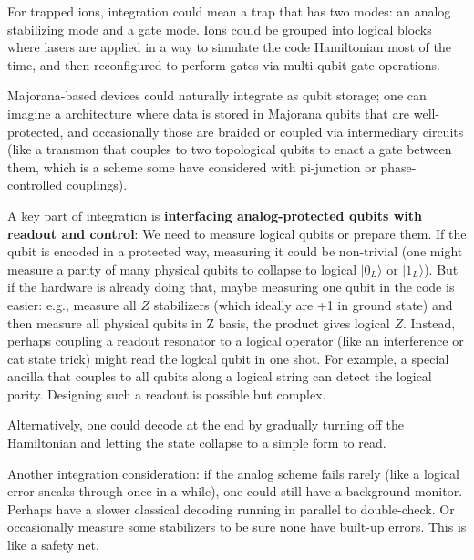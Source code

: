 \documentclass[11pt]{article}
\begin{document}
For trapped ions, integration could mean a trap that has two modes: an analog stabilizing mode and a gate mode. Ions could be grouped into logical blocks where lasers are applied in a way to simulate the code Hamiltonian most of the time, and then reconfigured to perform gates via multi-qubit gate operations.

Majorana-based devices could naturally integrate as qubit storage; one can imagine a architecture where data is stored in Majorana qubits that are well-protected, and occasionally those are braided or coupled via intermediary circuits (like a transmon that couples to two topological qubits to enact a gate between them, which is a scheme some have considered with pi-junction or phase-controlled couplings).

A key part of integration is \textbf{interfacing analog-protected qubits with readout and control}:
We need to measure logical qubits or prepare them. If the qubit is encoded in a protected way, measuring it could be non-trivial (one might measure a parity of many physical qubits to collapse to logical $|0_L\rangle$ or $|1_L\rangle$). But if the hardware is already doing that, maybe measuring one qubit in the code is easier: e.g., measure all $Z$ stabilizers (which ideally are +1 in ground state) and then measure all physical qubits in Z basis, the product gives logical $Z$. Instead, perhaps coupling a readout resonator to a logical operator (like an interference or cat state trick) might read the logical qubit in one shot. For example, a special ancilla that couples to all qubits along a logical string can detect the logical parity. Designing such a readout is possible but complex.

Alternatively, one could decode at the end by gradually turning off the Hamiltonian and letting the state collapse to a simple form to read.

Another integration consideration: if the analog scheme fails rarely (like a logical error sneaks through once in a while), one could still have a background monitor. Perhaps have a slower classical decoding running in parallel to double-check. Or occasionally measure some stabilizers to be sure none have built-up errors. This is like a safety net.
\end{document}
